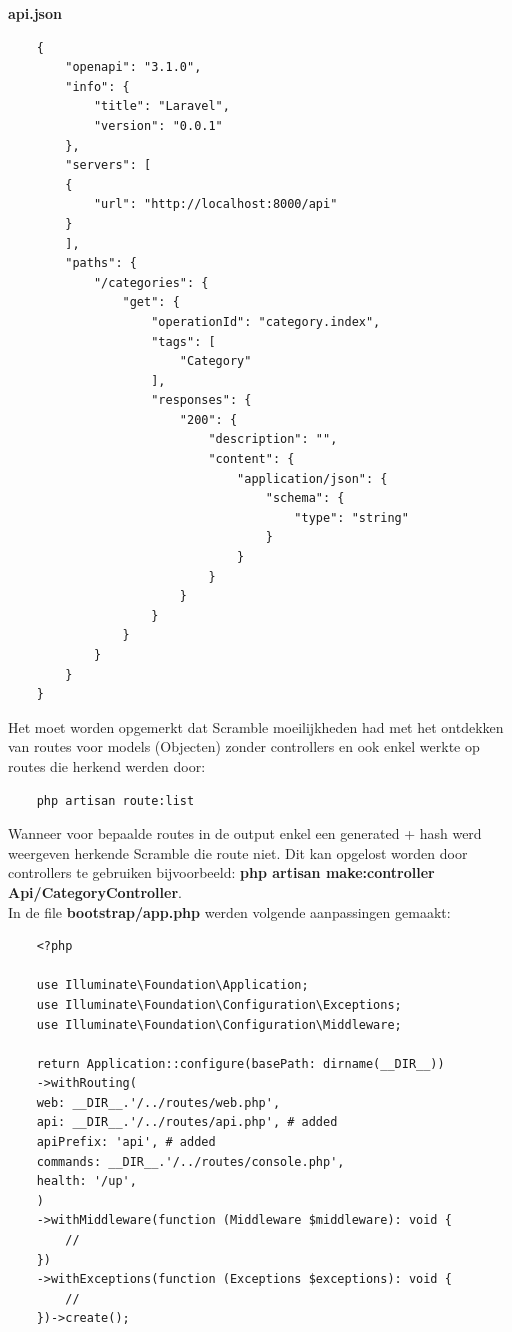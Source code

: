 \textbf{api.json}
\begin{verbatim}
    {
        "openapi": "3.1.0",
        "info": {
            "title": "Laravel",
            "version": "0.0.1"
        },
        "servers": [
        {
            "url": "http://localhost:8000/api"
        }
        ],
        "paths": {
            "/categories": {
                "get": {
                    "operationId": "category.index",
                    "tags": [
                        "Category"
                    ],
                    "responses": {
                        "200": {
                            "description": "",
                            "content": {
                                "application/json": {
                                    "schema": {
                                        "type": "string"
                                    }
                                }
                            }
                        }
                    }
                }
            }
        }
    }
\end{verbatim}

Het moet worden opgemerkt dat Scramble moeilijkheden had met het ontdekken van routes voor models (Objecten) zonder controllers en ook enkel werkte op routes die herkend werden door:
\begin{verbatim}
    php artisan route:list
\end{verbatim}
Wanneer voor bepaalde routes in de output enkel een generated + hash werd weergeven herkende Scramble die route niet. Dit kan opgelost worden door controllers te gebruiken bijvoorbeeld: \textbf{php artisan make:controller Api/CategoryController}. \\

In de file \textbf{bootstrap/app.php} werden volgende aanpassingen gemaakt:

\begin{verbatim}
    <?php
    
    use Illuminate\Foundation\Application;
    use Illuminate\Foundation\Configuration\Exceptions;
    use Illuminate\Foundation\Configuration\Middleware;
    
    return Application::configure(basePath: dirname(__DIR__))
    ->withRouting(
    web: __DIR__.'/../routes/web.php',
    api: __DIR__.'/../routes/api.php', # added
    apiPrefix: 'api', # added
    commands: __DIR__.'/../routes/console.php',
    health: '/up',
    )
    ->withMiddleware(function (Middleware $middleware): void {
        //
    })
    ->withExceptions(function (Exceptions $exceptions): void {
        //
    })->create();
\end{verbatim}

